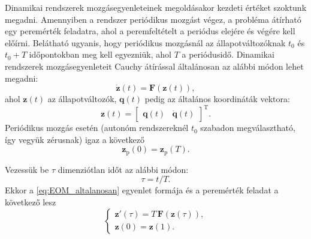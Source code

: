 Dinamikai rendszerek mozgásegyenleteinek megoldásakor kezdeti értéket szoktunk megadni.
Amennyiben a rendszer periódikus mozgást végez, a probléma átírható egy peremérték feladatra, ahol a peremfeltételt a periódus elejére és végére kell előírni.
Belátható ugyanis, hogy periódikus mozgásnál az állapotváltozóknak $t_0$ és $t_0 + T$ időpontokban meg kell egyezniük, ahol $T$ a periódusidő.
Dinamikai rendszerek mozgásegyenleteit Cauchy átírással általánosan az alábbi módon lehet megadni:
\begin{equation}
\dot{\mathbf{z}}(t) = \mathbf{F}(\mathbf{z}(t)),
\label{eq:EOM_altalanosan}
\end{equation}
ahol $\mathbf{z}(t)$ az állapotváltozók, $\mathbf{q}(t)$ pedig az általános koordináták vektora:
\begin{equation}
\mathbf{z}(t) = \begin{bmatrix}
\mathbf{q}(t) & \dot{\mathbf{q}}(t)
\end{bmatrix}^\mathrm{T}.
\end{equation}
Periódikus mozgás esetén (autonóm rendszereknél $t_0$ szabadon megválasztható, így vegyük zérusnak) igaz a következő
\begin{equation}
\mathbf{z}_\mathrm{p}(0) = \mathbf{z}_\mathrm{p}(T) .
\end{equation}

Vezessük be $\tau$ dimenziótlan időt az alábbi módon:
\begin{equation}
\tau =  t/T.
\end{equation}
Ekkor a \eqref{eq:EOM_altalanosan} egyenlet formája és a peremérték feladat a következő lesz
\begin{equation}
\begin{cases}
\mathbf{z}'(\tau) = T\,\mathbf{F}(\mathbf{z}(\tau)), \\
\mathbf{z}(0) = \mathbf{z}(1).
\end{cases}
\label{eq:EOM_dimtalan}
\end{equation}

